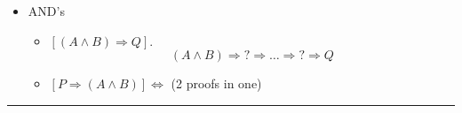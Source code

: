 \documentclass{article}
\begin{document}
\begin{enumerate}
\begin{itemize}
\begin{itemize}
\begin{itemize}
				\end{itemize}
				\item AND's
				\begin{itemize}
					\item $[(A\wedge B)\Rightarrow Q].$  $$(A\wedge B)\Rightarrow ?\Rightarrow \dots\Rightarrow ?\Rightarrow Q$$
					\item $[P\Rightarrow(A\wedge B)]\Leftrightarrow$  (2 proofs in one)
				\end{itemize}
			\end{itemize}
		\end{itemize}


	\end{enumerate}

	\hrule




\end{document}
